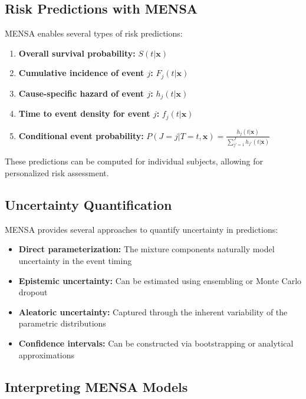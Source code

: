 \subsection{Risk Predictions with MENSA}

MENSA enables several types of risk predictions:

\begin{enumerate}
    \item \textbf{Overall survival probability:} $S(t|\mathbf{x})$
    \item \textbf{Cumulative incidence of event $j$:} $F_j(t|\mathbf{x})$
    \item \textbf{Cause-specific hazard of event $j$:} $h_j(t|\mathbf{x})$
    \item \textbf{Time to event density for event $j$:} $f_j(t|\mathbf{x})$
    \item \textbf{Conditional event probability:} $P(J=j|T=t, \mathbf{x}) = \frac{h_j(t|\mathbf{x})}{\sum_{j'=1}^{J} h_{j'}(t|\mathbf{x})}$
\end{enumerate}

These predictions can be computed for individual subjects, allowing for personalized risk assessment.

\subsection{Uncertainty Quantification}

MENSA provides several approaches to quantify uncertainty in predictions:

\begin{itemize}
    \item \textbf{Direct parameterization:} The mixture components naturally model uncertainty in the event timing
    \item \textbf{Epistemic uncertainty:} Can be estimated using ensembling or Monte Carlo dropout
    \item \textbf{Aleatoric uncertainty:} Captured through the inherent variability of the parametric distributions
    \item \textbf{Confidence intervals:} Can be constructed via bootstrapping or analytical approximations
\end{itemize}

\subsection{Interpreting MENSA Models}


